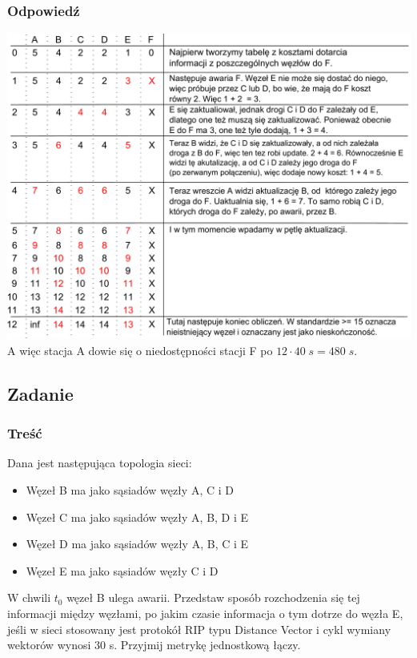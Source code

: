 		\subsubsection{Odpowiedź}
			\includegraphics[width=16.0cm]{./images/zadanie03.pdf}\\
			A więc stacja A dowie się o niedostępności stacji F po $ 12\cdot 40\;s=480\;s $.
\newpage
	\subsection{Zadanie}
		\subsubsection{Treść}
			Dana jest następująca topologia sieci:
			\begin{itemize}
				\item Węzeł B ma jako sąsiadów węzły A, C i D
				\item Węzeł C ma jako sąsiadów węzły A, B, D i E
				\item Węzeł D ma jako sąsiadów węzły A, B, C i E
				\item Węzeł E ma jako sąsiadów węzły C i D
			\end{itemize}
			W chwili $ t_0 $ węzeł B ulega awarii. Przedstaw sposób rozchodzenia się tej informacji między węzłami, po jakim czasie informacja o tym dotrze do węzła E, jeśli w sieci stosowany jest protokół RIP typu Distance Vector i cykl wymiany wektorów wynosi 30 s. Przyjmij metrykę jednostkową łączy.
